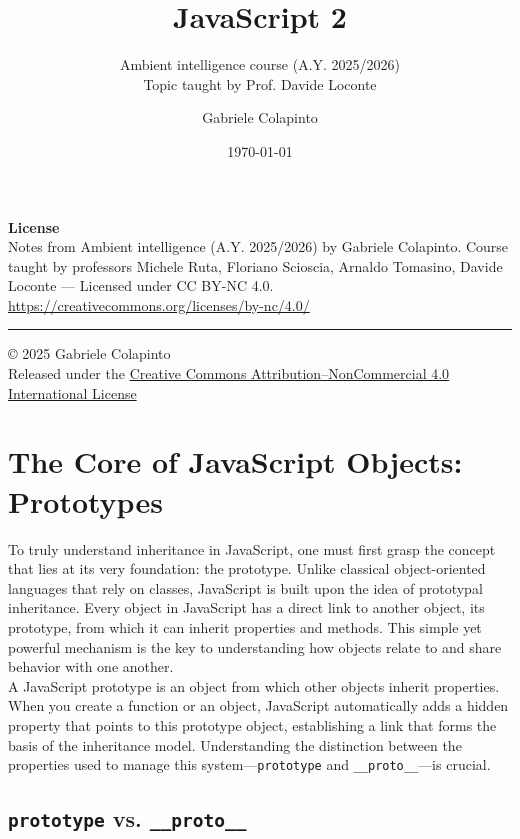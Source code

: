 \documentclass{scrbook}
\title{JavaScript 2}
\subtitle{Ambient intelligence course (A.Y. 2025/2026)\\Topic taught by Prof. Davide Loconte}
\author{Gabriele Colapinto}
\date{\today}
\begin{document}
\maketitle
\thispagestyle{empty}

{\Large\textbf{License}} \\
{Notes from Ambient intelligence (A.Y. 2025/2026) by Gabriele Colapinto. 
Course taught by professors Michele Ruta, Floriano Scioscia, Arnaldo Tomasino, Davide Loconte — 
Licensed under CC BY-NC 4.0.\\
\url{https://creativecommons.org/licenses/by-nc/4.0/}}

\vspace*{\fill}
\rule{\textwidth}{0.2pt}
\small{© 2025 Gabriele Colapinto \\
Released under the \href{https://creativecommons.org/licenses/by-nc/4.0/}{Creative Commons Attribution–NonCommercial 4.0 International License}}

\clearpage

\tableofcontents

\chapter{The Core of JavaScript Objects: Prototypes}

To truly understand inheritance in JavaScript, one must first grasp the concept that lies at its very foundation: the prototype. Unlike classical object-oriented languages that rely on classes, JavaScript is built upon the idea of prototypal inheritance. Every object in JavaScript has a direct link to another object, its prototype, from which it can inherit properties and methods. This simple yet powerful mechanism is the key to understanding how objects relate to and share behavior with one another. \\

A JavaScript prototype is an object from which other objects inherit properties. When you create a function or an object, JavaScript automatically adds a hidden property that points to this prototype object, establishing a link that forms the basis of the inheritance model. Understanding the distinction between the properties used to manage this system—\texttt{prototype} and \texttt{\_\_proto\_\_}—is crucial.

\section{\texttt{prototype} vs. \texttt{\_\_proto\_\_}}
\end{document}
